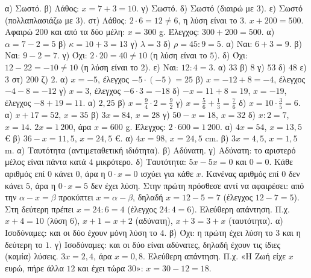  α) Σωστό. \quad β) Λάθος: $x=7+3=10$. \quad γ) Σωστό. \quad δ) Σωστό (διαιρώ με $3$). \quad ε) Σωστό (πολλαπλασιάζω με $3$). \quad στ) Λάθος: $2\cdot6=12\neq6$, η λύση είναι το $3$.
 $x+200=500$. Αφαιρώ $200$ και από τα δύο μέλη: $x=300$ g. Έλεγχος: $300+200=500$.
 α) $\alpha=7-2=5$ \quad β) $\kappa=10+3=13$ \quad γ) $\lambda=3$ \quad δ) $\rho=45:9=5$.
 α) Ναι: $6+3=9$. \quad β) Ναι: $9-2=7$. \quad γ) Όχι: $2\cdot20=40\neq10$ (η λύση είναι το $5$). \quad δ) Όχι: $12-22=-10\neq10$ (η λύση είναι το $2$). \quad ε) Ναι: $12:4=3$.
 α) $33$ \quad β) $8$ \quad γ) $53$ \quad δ) $48$ \quad ε) $3$ \quad στ) $200$ \quad ζ) $2$.
 α) $x=-5$, έλεγχος $-5\cdot(-5)=25$ \quad β) $x=-12+8=-4$, έλεγχος $-4-8=-12$ \quad γ) $x=3$, έλεγχος $-6\cdot3=-18$ \quad δ) $-x=11+8=19$, $x=-19$, έλεγχος $-8+19=11$.
 α) $2{,}25$ \quad β) $x=\frac{9}{4}\cdot2=\frac{9}{2}$ \quad γ) $x=\frac{5}{6}+\frac{1}{3}=\frac{7}{6}$ \quad δ) $x=10\cdot\frac{3}{5}=6$.
 α) $x+17=52$, $x=35$ \quad β) $3x=84$, $x=28$ \quad γ) $50-x=18$, $x=32$ \quad δ) $x:2=7$, $x=14$.
 $2x=1\,200$, άρα $x=600$ g. Έλεγχος: $2\cdot600=1\,200$.
 α) $4x=54$, $x=13{,}5$ € \quad β) $36-x=11{,}5$, $x=24{,}5$ €.
 α) $4x=98$, $x=24{,}5$ cm. \quad β) $3x=4{,}5$, $x=1{,}5$ m.
 α) Ταυτότητα (αντιμεταθετική ιδιότητα). \quad β) Αδύνατη. \quad γ) Αδύνατη: το αριστερό μέλος είναι πάντα κατά $4$ μικρότερο. \quad δ) Ταυτότητα: $5x-5x=0$ και $0=0$.
 Κάθε αριθμός επί $0$ κάνει $0$, άρα η $0\cdot x=0$ ισχύει για κάθε $x$. Κανένας αριθμός επί $0$ δεν κάνει $5$, άρα η $0\cdot x=5$ δεν έχει λύση.
 Στην πρώτη πρόσθεσε αντί να αφαιρέσει: από την $\alpha-x=\beta$ προκύπτει $x=\alpha-\beta$, δηλαδή $x=12-5=7$ (έλεγχος $12-7=5$). Στη δεύτερη πρέπει $x=24:6=4$ (έλεγχος $24:4=6$).
 Ελεύθερη απάντηση. Π.χ. $x+4=10$ (λύση $6$), $x+1=x+2$ (αδύνατη), $x+3=3+x$ (ταυτότητα).
 α) Ισοδύναμες: και οι δύο έχουν μόνη λύση το $4$. \quad β) Όχι: η πρώτη έχει λύση το $3$ και η δεύτερη το $1$. \quad γ) Ισοδύναμες: και οι δύο είναι αδύνατες, δηλαδή έχουν τις ίδιες (καμία) λύσεις.
 $3x=2{,}4$, άρα $x=0{,}8$.
 Ελεύθερη απάντηση. Π.χ. «Η Ζωή είχε $x$ ευρώ, πήρε άλλα $12$ και έχει τώρα $30$»: $x=30-12=18$.
